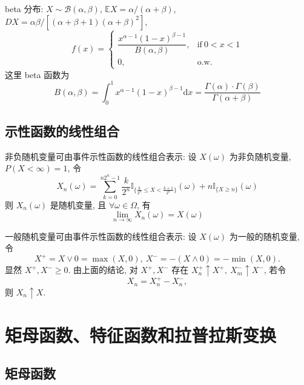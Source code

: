 \documentclass[openany]{ctexbook}
\theoremstyle{kaiti}
\theoremstyle{normal}
\begin{document}
beta 分布: $X\sim \mathcal{B}(\alpha,\beta)$, $\mathbb{E}X=\alpha/(\alpha+\beta)$, $DX=\alpha\beta/[(\alpha+\beta+1)(\alpha+\beta)^2]$,
\begin{equation}
  f(x)=\begin{cases}\dfrac{x^{\alpha-1}(1-x)^{\beta-1}}{B(\alpha,\beta)},&\text{if}~0<x<1\\0,&\text{o.w.}\end{cases}
\end{equation}
 这里 beta 函数为
\begin{equation}
  B(\alpha,\beta)=\int_0^1 x^{\alpha-1}(1-x)^{\beta-1}\mathrm{d}x=\frac{\Gamma(\alpha)\cdot\Gamma(\beta)}{\Gamma(\alpha+\beta)}
\end{equation}


\subsection{示性函数的线性组合}

非负随机变量可由事件示性函数的线性组合表示: 设 $X(\omega)$ 为非负随机变量, $P(X<\infty)=1$, 令
\begin{equation}
  X_n(\omega)=\sum_{k=0}^{n2^n-1}\frac{k}{2^n}\mathbb{I}_{\{\frac{k}{2^n}\leqslant X<\frac{k+1}{2^n}\}}(\omega)+n\mathbb{I}_{\{X\geqslant n\}}(\omega)
\end{equation}
 则 $X_n(\omega)$ 是随机变量, 且 $\forall\omega\in\Omega$, 有
\begin{equation}
  \lim_{n\to\infty}X_n(\omega)=X(\omega)
\end{equation}


一般随机变量可由事件示性函数的线性组合表示: 设 $X(\omega)$ 为一般的随机变量, 令
\begin{equation}
  X^+=X\vee0=\max(X,0),~X^-=-(X\wedge0)=-\min(X,0).
\end{equation}
 显然 $X^+,X^-\geqslant0$. 由上面的结论, 对 $X^+,X^-$ 存在 $X_n^+\uparrow X^+,~X_m^-\uparrow X^-$, 若令
\begin{equation}
  X_n=X_n^+-X_n^-,
\end{equation}
 则 $X_n\uparrow X$.

\section{矩母函数、特征函数和拉普拉斯变换}

\subsection{矩母函数}
\end{document}
